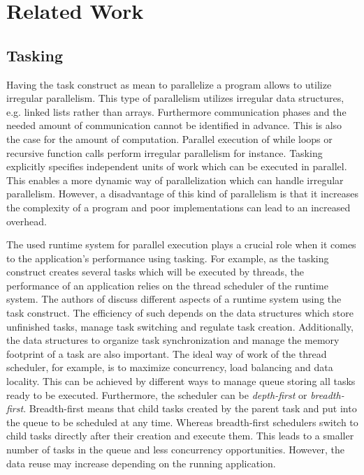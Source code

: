 \section{Related Work}

\subsection{Tasking}
\label{subsec:Tasking}
  Having the task construct as mean to parallelize a program allows to utilize irregular parallelism.
  This type of parallelism utilizes irregular data structures, e.g. linked lists rather than arrays.
  Furthermore communication phases and the needed amount of communication cannot be identified in advance.
  This is also the case for the amount of computation.\cite{Chakrabarti.1993}
  Parallel execution of while loops or recursive function calls perform irregular parallelism for instance.
  Tasking explicitly specifies independent units of work which can be executed in parallel.
  This enables a more dynamic way of parallelization which can handle irregular parallelism.
  However, a disadvantage of this kind of parallelism is that it increases the complexity of a program and poor implementations can lead to an increased overhead.~\cite{Ayguade.2009}~\cite{LaGrone.2011} 
  
  The used runtime system for parallel execution plays a crucial role when it comes to the application's performance using tasking. 
  For example, as the tasking construct creates several tasks which will be executed by threads, the performance of an application relies on the thread scheduler of the runtime system.
  The authors of \cite{LaGrone.2011} discuss different aspects of a runtime system using the task construct.
  The efficiency of such depends on the data structures which store unfinished tasks, manage task switching and regulate task creation.
  Additionally, the data structures to organize task synchronization and manage the memory footprint of a task are also important.
  The ideal way of work of the thread scheduler, for example, is to maximize concurrency, load balancing and data locality.
  This can be achieved by different ways to manage queue storing all tasks ready to be executed.
  Furthermore, the scheduler can be \textit{depth-first} or \textit{breadth-first}.
  Breadth-first means that child tasks created by the parent task and put into the queue to be scheduled at any time.
  Whereas breadth-first schedulers switch to child tasks directly after their creation and execute them.
  This leads to a smaller number of tasks in the queue and less concurrency opportunities.
  However, the data reuse may increase depending on the running application.
 
